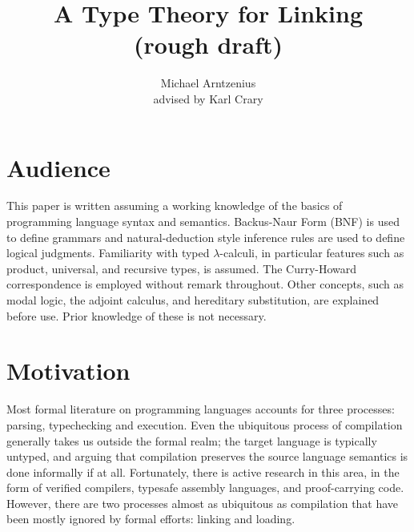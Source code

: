 \documentclass[11pt]{article}
\title{A Type Theory for Linking\\{\large (rough draft)}}
\author{Michael Arntzenius\\advised by Karl Crary}
\newcommand{\bscolor}{blue}
\newcommand{\bs}[1]{\textcolor{\bscolor}{#1}}
\begin{document}
\maketitle



\section{Audience}

This paper is written assuming a working knowledge of the basics of programming
language syntax and semantics. Backus-Naur Form (BNF) is used to define grammars
and natural-deduction style inference rules are used to define logical
judgments. Familiarity with typed $\lambda$-calculi, in particular features such
as product, universal, and recursive types, is assumed. The Curry-Howard
correspondence is employed without remark throughout. Other concepts, such as
modal logic, the adjoint calculus, and hereditary substitution, are explained
before use. Prior knowledge of these is not necessary.





\section{Motivation}

Most formal literature on programming languages accounts for three processes:
parsing, typechecking and execution. Even the ubiquitous process of compilation
generally takes us outside the formal realm; the target language is typically
untyped, and arguing that compilation preserves the source language semantics is
done informally if at all. Fortunately, there is active research in this area,
in the form of verified compilers, typesafe assembly languages, and
proof-carrying code. However, there are two processes almost as ubiquitous as
compilation that have been mostly ignored by formal efforts: linking and
loading.
\end{document}
